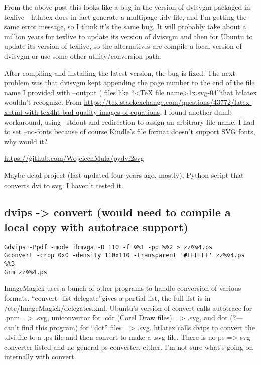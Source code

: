 \documentclass[12pt]{article}
\begin{document}
From the above post this looks like a bug in the version of dvisvgm
packaged in texlive---htlatex does in fact generate a multipage .idv
file, and I'm getting the same error message, so I think it's the same
bug.  It will probably take about a million years for texlive to
update its version of dvisvgm and then for Ubuntu to update its
version of texlive, so the alternatives are compile a local version of
dvisvgm or use some other utility/conversion path.

After compiling and installing the latest version, the bug is fixed.
The next problem was that dvisvgm kept appending the page number to
the end of the file name I provided with --output (%
files like ``<TeX file name>1x.svg-04''that htlatex wouldn't
recognize.  From
\url{https://tex.stackexchange.com/questions/43772/latex-xhtml-with-tex4ht-bad-quality-images-of-equations},
I found another dumb workaround, using --stdout and redirection to
assign an arbitrary file name.  I had to set --no-fonts because of
course Kindle's file format doesn't support SVG fonts, why would it?

\url{https://github.com/WojciechMula/pydvi2svg}

Maybe-dead project (last updated four years ago, mostly), Python
script that converts dvi to svg.  I haven't tested it.

\subsection{dvips -> convert (would need to compile a local copy with
  autotrace support)}
\label{sec:dvips_convert}

\begin{lstlisting}
Gdvips -Ppdf -mode ibmvga -D 110 -f %%1 -pp %%2 > zz%%4.ps
Gconvert -crop 0x0 -density 110x110 -transparent '#FFFFFF' zz%%4.ps %%3
Grm zz%%4.ps
\end{lstlisting}

ImageMagick uses a bunch of other programs to handle conversion of
various formats.  ``convert -list delegate''gives a partial list, the
full list is in /etc/ImageMagick/delegates.xml.  Ubuntu's version of
convert calls autotrace for .pnm => .svg, uniconvertor for .cdr (Corel
Draw files) => .svg, and dot (?---can't find this program) for ``dot''
files => .svg.  htlatex calls dvips to convert the .dvi file to a .ps
file and then convert to make a .svg file.  There is no ps => svg
converter listed and no general ps converter, either.  I'm not sure
what's going on internally with convert.
\end{document}
